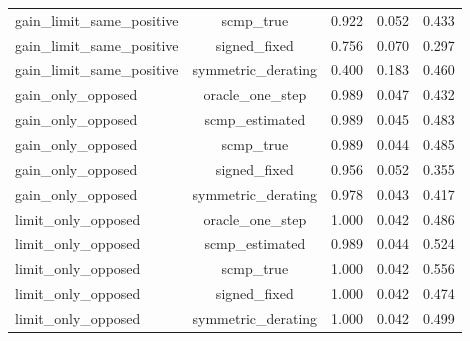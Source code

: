 \begin{table}[t]
\begin{tabular}{lcccc}
gain\_limit\_same\_positive & scmp\_true & 0.922 & 0.052 & 0.433 \\
gain\_limit\_same\_positive & signed\_fixed & 0.756 & 0.070 & 0.297 \\
gain\_limit\_same\_positive & symmetric\_derating & 0.400 & 0.183 & 0.460 \\
gain\_only\_opposed & oracle\_one\_step & 0.989 & 0.047 & 0.432 \\
gain\_only\_opposed & scmp\_estimated & 0.989 & 0.045 & 0.483 \\
gain\_only\_opposed & scmp\_true & 0.989 & 0.044 & 0.485 \\
gain\_only\_opposed & signed\_fixed & 0.956 & 0.052 & 0.355 \\
gain\_only\_opposed & symmetric\_derating & 0.978 & 0.043 & 0.417 \\
limit\_only\_opposed & oracle\_one\_step & 1.000 & 0.042 & 0.486 \\
limit\_only\_opposed & scmp\_estimated & 0.989 & 0.044 & 0.524 \\
limit\_only\_opposed & scmp\_true & 1.000 & 0.042 & 0.556 \\
limit\_only\_opposed & signed\_fixed & 1.000 & 0.042 & 0.474 \\
limit\_only\_opposed & symmetric\_derating & 1.000 & 0.042 & 0.499 \\
\bottomrule
\end{tabular}
\end{table}

